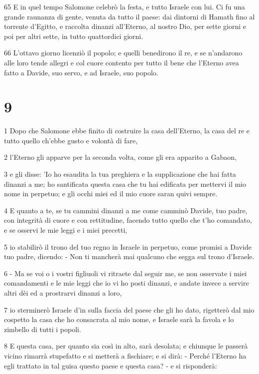 \par 65 E in quel tempo Salomone celebrò la festa, e tutto Israele con lui. Ci fu una grande raunanza di gente, venuta da tutto il paese: dai dintorni di Hamath fino al torrente d'Egitto, e raccolta dinanzi all'Eterno, al nostro Dio, per sette giorni e poi per altri sette, in tutto quattordici giorni.
\par 66 L'ottavo giorno licenziò il popolo; e quelli benedirono il re, e se n'andarono alle loro tende allegri e col cuore contento per tutto il bene che l'Eterno avea fatto a Davide, suo servo, e ad Israele, suo popolo.

\chapter{9}

\par 1 Dopo che Salomone ebbe finito di costruire la casa dell'Eterno, la casa del re e tutto quello ch'ebbe gusto e volontà di fare,
\par 2 l'Eterno gli apparve per la seconda volta, come gli era apparito a Gabaon,
\par 3 e gli disse: 'Io ho esaudita la tua preghiera e la supplicazione che hai fatta dinanzi a me; ho santificata questa casa che tu hai edificata per mettervi il mio nome in perpetuo; e gli occhi miei ed il mio cuore saran quivi sempre.
\par 4 E quanto a te, se tu cammini dinanzi a me come camminò Davide, tuo padre, con integrità di cuore e con rettitudine, facendo tutto quello che t'ho comandato, e se osservi le mie leggi e i miei precetti,
\par 5 io stabilirò il trono del tuo regno in Israele in perpetuo, come promisi a Davide tuo padre, dicendo: - Non ti mancherà mai qualcuno che segga sul trono d'Israele.
\par 6 - Ma se voi o i vostri figliuoli vi ritraete dal seguir me, se non osservate i miei comandamenti e le mie leggi che io vi ho posti dinanzi, e andate invece a servire altri dèi ed a prostrarvi dinanzi a loro,
\par 7 io sterminerò Israele d'in sulla faccia del paese che gli ho dato, rigetterò dal mio cospetto la casa che ho consacrata al mio nome, e Israele sarà la favola e lo zimbello di tutti i popoli.
\par 8 E questa casa, per quanto sia così in alto, sarà desolata; e chiunque le passerà vicino rimarrà stupefatto e si metterà a fischiare; e si dirà: - Perché l'Eterno ha egli trattato in tal guisa questo paese e questa casa? - e si risponderà:

